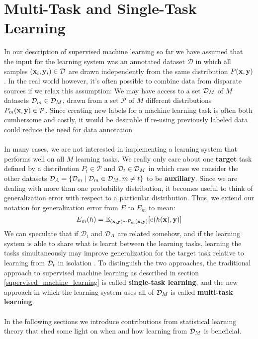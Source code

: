 \section{Multi-Task and Single-Task Learning}
\label{multiTaskAndSingleTaskLearning}

In our description of supervised machine learning so far we have assumed that the input for the learning system was an annotated dataset $\mathcal{D}$ in which all samples $(\mathbf{x}_i, \mathbf{y}_i) \in \mathcal{D}$ are drawn independently from the same distribution $P(\mathbf{x}, \mathbf{y})$. In the real world however, it's often possible to combine data from disparate sources if we relax this assumption: We may have access to a set $\mathcal{D}_M$ of $M$ datasets $\mathcal{D}_m \in \mathcal{D}_M$, drawn from a set $\mathcal{P}$ of $M$ different distributions $P_m(\mathbf{x}, \mathbf{y}) \in \mathcal{P}$. Since creating new labels for a machine learning task is often both cumbersome and costly, it would be desirable if re-using previously labeled data could reduce the need for data annotation
\\\\
In many cases, we are not interested in implementing a learning system that performs well on all $M$ learning tasks. We really only care about one \textbf{target} task defined by a distribution $P_t \in \mathcal{P}$ and $\mathcal{D}_t \in \mathcal{D}_M$ in which case we consider the other datasets $\mathcal{D}_A = \{\mathcal{D}_m \mid \mathcal{D}_m \in \mathcal{D}_M, m \neq t\}$ to be \textbf{auxiliary}. Since we are dealing with more than one probability distribution, it becomes useful to think of generalization error with respect to a particular distribution. Thus, we extend our notation for generalization error from $E$ to $E_m$ to mean:
$$
E_m(h) = \mathbb{E}_{(\mathbf{x},\mathbf{y}) \sim P_m(\mathbf{x},\mathbf{y})}[e(h(\mathbf{x}),\mathbf{y})]
$$
\noindent
We can speculate that if $\mathcal{D}_t$ and $\mathcal{D}_A$ are related somehow, and if the learning system is able to share what is learnt between the learning tasks, learning the tasks simultaneously may improve generalization for the target task relative to learning from $\mathcal{D}_t$ in isolation \citep{caruana1997}. To distinguish the two approaches, the traditional approach to supervised machine learning as described in section \ref{supervised_machine_learning} is called \textbf{single-task learning}, and the new approach in which the learning system uses all of $\mathcal{D}_M$ is called \textbf{multi-task learning}.
\\\\
In the following sections we introduce contributions from statistical learning theory that shed some light on when and how learning from $\mathcal{D}_M$ is beneficial.





